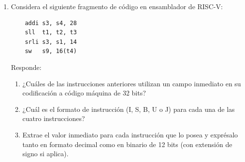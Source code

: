 \documentclass[letterpaper,12pt]{article}
\begin{document}
\begin{enumerate}
    Supón que Ben comete un error y reemplaza la instrucción en la dirección \texttt{0x8014} (\texttt{sw a0, 0xC(sp)}) por un \texttt{nop}. Explica detalladamente qué le ocurrirá al programa y selecciona una de las siguientes opciones justificando tu respuesta:
    \begin{enumerate}[label=\arabic*)]
        \item Entrará en un bucle infinito pero no fallará catastróficamente.
        \item Fallará catastróficamente (\textit{crash}), provocando que la pila crezca o se reduzca fuera del segmento de datos dinámicos, o que el PC salte a una posición inválida fuera del programa.
        \item Producirá un valor incorrecto en el registro \texttt{a0} cuando el programa regrese a la instrucción \texttt{loop}. Si es así, ¿qué valor produciría?
        \item Correrá correctamente a pesar de la instrucción eliminada.
    \end{enumerate}

    \color{red}
    \textbf{Solución: [Pendiente por resolver]}
    \color{black}

    \vspace{0.5cm}
    \pagebreak

    \item Considera el siguiente fragmento de código en ensamblador de RISC-V:
    \begin{verbatim}
    addi s3, s4, 28
    sll  t1, t2, t3
    srli s3, s1, 14
    sw   s9, 16(t4)
    \end{verbatim}
    
    Responde:
    \begin{enumerate}[label=\alph*)]
        \item ¿Cuáles de las instrucciones anteriores utilizan un campo inmediato en su codificación a código máquina de 32 bits?
        \item ¿Cuál es el formato de instrucción (I, S, B, U o J) para cada una de las cuatro instrucciones?
        \item Extrae el valor inmediato para cada instrucción que lo posea y exprésalo tanto en formato decimal como en binario de 12 bits (con extensión de signo si aplica).
    \end{enumerate}


\end{enumerate}
\end{document}
